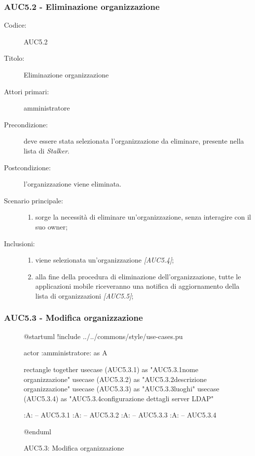 \documentclass[../../../analisi-dei-requisiti.tex]{subfiles}
\begin{document}
\subsubsection{AUC5.2 - Eliminazione organizzazione}%
\label{subs:AUC5.2}
\begin{description}
  \item[Codice:] AUC5.2
  \item[Titolo:] Eliminazione organizzazione
  \item[Attori primari:] amministratore
  \item[Precondizione:] deve essere stata selezionata l'organizzazione da eliminare, presente nella lista di \emph{Stalker}.
  \item[Postcondizione:] l'organizzazione viene eliminata.
  \item[Scenario principale:]
  \begin{enumerate}
    \item sorge la necessità di eliminare un'organizzazione, senza interagire con il suo owner;
  \end{enumerate}
  \item[Inclusioni:]
  \begin{enumerate}
    \item viene selezionata un'organizzazione \emph{[AUC5.4]};
    \item alla fine della procedura di eliminazione dell'organizzazione, tutte le applicazioni mobile riceveranno una notifica di aggiornamento della lista di organizzazioni \emph{[AUC5.5]};
  \end{enumerate}
\end{description}

\subsubsection{AUC5.3 - Modifica organizzazione}%
\label{subs:AUC5.3}

\begin{figure}[H]
  \centering
  \begin{plantuml}
  @startuml
  !include ../../commons/style/use-cases.pu

  actor :amministratore: as A

  rectangle {
    together {
      usecase (AUC5.3.1) as "AUC5.3.1\nModifica nome organizzazione"
      usecase (AUC5.3.2) as "AUC5.3.2\nModifica descrizione organizzazione"
      usecase (AUC5.3.3) as "AUC5.3.3\nGestione luoghi"
      usecase (AUC5.3.4) as "AUC5.3.4\nModifica configurazione dettagli server LDAP"
    }
  }

  :A: -- AUC5.3.1
  :A: -- AUC5.3.2
  :A: -- AUC5.3.3
  :A: -- AUC5.3.4

  @enduml
  \end{plantuml}
  \caption{AUC5.3: Modifica organizzazione}
  \label{fig:AUC5_3}
\end{figure}
\end{document}
